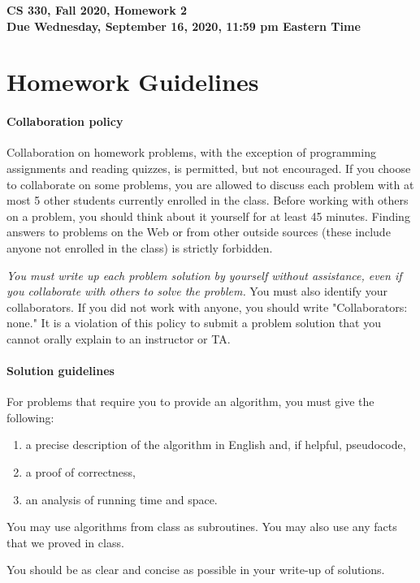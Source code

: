 \documentclass[11pt]{article}
\begin{document}
	
\begin{center}
\Large{\textbf{CS 330, Fall 2020, Homework 2 \\
Due Wednesday, September
  16, 2020, 11:59 pm Eastern Time}}
\end{center}


\section*{Homework Guidelines}

\paragraph{Collaboration policy} Collaboration on homework problems, with the exception of
programming assignments and reading quizzes, is permitted, but not encouraged.
If you
choose to collaborate on some problems, you are allowed to discuss
each problem with at most 5 other students currently enrolled in the
class.
Before working with others on a problem, you should think about it
yourself for at least 45 minutes. Finding answers to problems on the
Web or from other outside sources (these include anyone not enrolled
in the class) is strictly forbidden.

{\em You must write up each problem solution by yourself without
assistance, even if you collaborate with others to solve the
problem.} You must also identify your collaborators. If you did not
work with anyone, you should write "Collaborators: none." It is a
violation of this policy to submit a problem solution that you
cannot orally explain to an instructor or TA.

\paragraph{Solution guidelines} For problems that require you to provide an algorithm, you must give the following:
    \begin{enumerate}
\item  a precise description of the algorithm in English and, if helpful, pseudocode,
\item a proof of correctness,
\item an analysis of running time and space.
\end{enumerate}
You may use algorithms from class as subroutines. You may also use any facts that we proved in class.


You should be as clear and concise as possible in your write-up of
solutions. 
\end{document}
